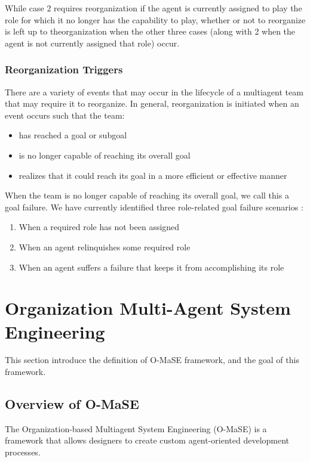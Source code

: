 While case 2 requires reorganization if the agent is currently assigned to play the role for which it no longer has the capability to play, whether or not to reorganize is left up to theorganization when the other three cases (along with 2 when the agent is not currently assigned that role) occur\cite{omacs2}.


\subsubsection{Reorganization Triggers}

There are a variety of events that may occur in the lifecycle of a multiagent team that may require it to reorganize. In
general, reorganization is initiated when an event occurs such that the team\cite{omacs1}:
\begin{itemize}
\newcommand{\localtextbulletone}{\textcolor{gray}{\raisebox{.45ex}{\rule{.6ex}{.6ex}}}}
\renewcommand{\labelitemi}{\localtextbulletone}
	\item has reached a goal or subgoal
	\item is no longer capable of reaching its overall goal
	\item realizes that it could reach its goal in a more efficient or effective manner
\end{itemize}
 

When the team is no longer capable of reaching its overall goal, 
we call this a goal failure. We have currently identified three role-related goal failure
scenarios \cite{omacs1}:

\begin{enumerate}
	\item When a required role has not been assigned
	\item When an agent relinquishes some required role
	\item When an agent suffers a failure that keeps it from accomplishing its role 
\end{enumerate}

\section{Organization Multi-Agent System Engineering}
This section introduce the definition of O-MaSE framework, and the goal of this framework. 
\subsection{Overview of O-MaSE}
The Organization-based Multiagent System Engineering (O-MaSE) is a framework that 
 allows designers to create custom agent-oriented development processes. 
 
